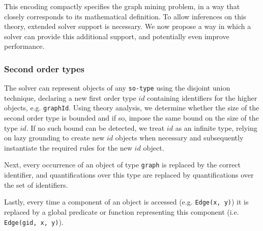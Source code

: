 This encoding compactly specifies the graph mining problem, in a way that closely corresponds to its mathematical definition.
To allow inferences on this theory, extended solver support is necessary.
We now propose a way in which a solver can provide this additional support, and potentially even improve performance.

\subsubsection{Second order types}
The solver can represent objects of any \lstinline|so-type| using the disjoint union technique, declaring a new first order type $id$ containing identifiers for the higher objects, e.g. \lstinline|graphId|.
Using theory analysis, we determine whether the size of the second order type is bounded and if so, impose the same bound on the size of the type $id$.
If no such bound can be detected, we treat $id$ as an infinite type, relying on lazy grounding to create new $id$ objects when necessary and subsequently instantiate the required rules for the new $id$ object.

Next, every occurrence of an object of type \lstinline|graph| is replaced by the correct identifier, and quantifications over this type are replaced by quantifications over the set of identifiers.

Lastly, every time a component of an object is accessed (e.g. \lstinline|Edge(x, y)|) it is replaced by a global predicate or function representing this component (i.e. \lstinline|Edge(gid, x, y)|).


